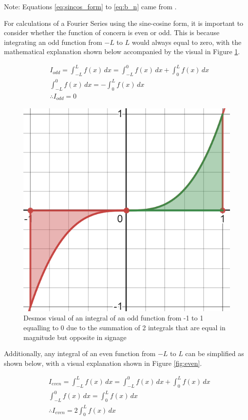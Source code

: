 \documentclass[letterpaper, 12pt]{article}
\begin{document}
Note: Equations \ref*{eq:sincos_form} to \ref*{eq:b_n} came from \cite{tisdellHowComputeFourier2009}.

For calculations of a Fourier Series using the sine-cosine form,
it is important to consider whether the function of concern
is even or odd. This is because integrating an odd function
from \(-L\) to \(L\) would always equal to zero,
with the mathematical explanation shown below
accompanied by the visual in Figure \ref*{fig:odd}.

\begin{align*}
     & I_{odd} = \int_{-L}^{L} f(x) \,dx = \int_{-L}^{0} f(x) \,dx + \int_{0}^{L} f(x) \,dx
    \\
     & \int_{-L}^{0} f(x) \,dx = -\int_{0}^{L} f(x) \,dx
    \\
     & \therefore I_{odd} = 0
\end{align*}

\begin{figure}[H]
    \centering
    \includegraphics[width=.6\textwidth]{odd.png}
    \caption{Desmos visual of an integral of an odd function from -1 to 1 equalling to 0 due to the summation of 2 integrals that are equal in magnitude but opposite in signage}
    \label{fig:odd}
\end{figure}

Additionally, any integral of an even function from \(-L\) to \(L\) can be simplified
as shown below, with a visual explanation shown in Figure \ref*{fig:even}.

\begin{align*}
     & I_{even} = \int_{-L}^{L} f(x) \,dx = \int_{-L}^{0} f(x) \,dx + \int_{0}^{L} f(x) \,dx
    \\
     & \int_{-L}^{0} f(x) \,dx = \int_{0}^{L} f(x) \,dx
    \\
     & \therefore I_{even} = 2\int_{0}^{L} f(x) \,dx
\end{align*}
\end{document}
